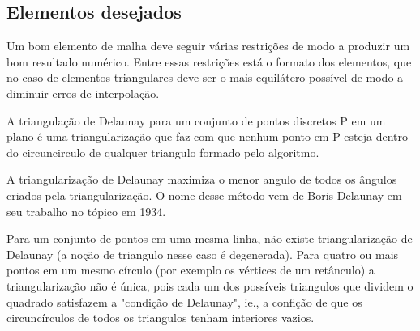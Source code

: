 \subsection{Elementos desejados}
Um bom elemento de malha deve seguir várias restrições de modo a produzir um bom resultado numérico. Entre essas restrições está o formato dos elementos, que no caso de elementos triangulares deve ser o mais equilátero possível de modo a diminuir erros de interpolação.

A triangulação de Delaunay para um conjunto de pontos discretos P em um plano é uma triangularização que faz com que nenhum ponto em P esteja dentro do circuncirculo de qualquer triangulo formado pelo algoritmo.

A triangularização de Delaunay maximiza o menor angulo de todos os ângulos criados pela triangularização. O nome desse método vem de Boris Delaunay em seu trabalho no tópico em 1934.

Para um conjunto de pontos em uma mesma linha, não existe triangularização de Delaunay (a noção de triangulo nesse caso é degenerada). Para quatro ou mais pontos em um mesmo círculo (por exemplo os vértices de um retânculo) a triangularização não é única, pois cada um dos possíveis triangulos que dividem o quadrado satisfazem a "condição de Delaunay", ie., a confição de que os circuncírculos de todos os triangulos tenham interiores vazios.
